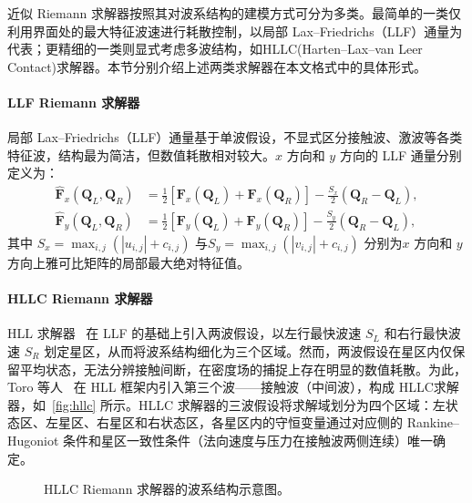\documentclass[12pt,a4paper]{article}
\numberwithin{equation}{section}    %
\begin{document}
近似 Riemann 求解器按照其对波系结构的建模方式可分为多类。最简单的一类仅利用界面处的最大特征波速进行耗散控制，以局部 Lax--Friedrichs（LLF）通量为代表；更精细的一类则显式考虑多波结构，如HLLC(Harten–Lax–van Leer Contact)求解器。本节分别介绍上述两类求解器在本文格式中的具体形式。

\paragraph{LLF Riemann 求解器}

局部 Lax--Friedrichs（LLF）通量基于单波假设，不显式区分接触波、激波等各类特征波，结构最为简洁，但数值耗散相对较大。$x$ 方向和 $y$ 方向的 LLF 通量分别定义为：
\begin{equation}
    \label{eq:llf}
    \begin{aligned}
        \hat{\bm{F}}_x(\bm{Q}_L, \bm{Q}_R)
         & = \frac{1}{2}\left[\bm{F}_x(\bm{Q}_L) + \bm{F}_x(\bm{Q}_R)\right]
        - \frac{S_x}{2}\left(\bm{Q}_R - \bm{Q}_L\right), \\
        \hat{\bm{F}}_y(\bm{Q}_L, \bm{Q}_R)
         & = \frac{1}{2}\left[\bm{F}_y(\bm{Q}_L) + \bm{F}_y(\bm{Q}_R)\right]
        - \frac{S_y}{2}\left(\bm{Q}_R - \bm{Q}_L\right),
    \end{aligned}
\end{equation}
其中 $S_x = \max_{i,j}(|u_{i,j}| + c_{i,j})$ 与$S_y = \max_{i,j}(|v_{i,j}| + c_{i,j})$ 分别为$x$ 方向和 $y$ 方向上雅可比矩阵的局部最大绝对特征值。

\paragraph{HLLC Riemann 求解器}
HLL 求解器~\cite{harten1983upstream} 在 LLF 的基础上引入两波假设，以左行最快波速 $S_L$ 和右行最快波速 $S_R$ 划定星区，从而将波系结构细化为三个区域。然而，两波假设在星区内仅保留平均状态，无法分辨接触间断，在密度场的捕捉上存在明显的数值耗散。为此，Toro 等人~\cite{toro1994restoration} 在 HLL 框架内引入第三个波——接触波（中间波），构成 HLLC求解器，如~\autoref{fig:hllc} 所示。HLLC 求解器的三波假设将求解域划分为四个区域：左状态区、左星区、右星区和右状态区，各星区内的守恒变量通过对应侧的 Rankine--Hugoniot 条件和星区一致性条件（法向速度与压力在接触波两侧连续）唯一确定。
\begin{figure}[htbp]
    \centering
    
    \caption{HLLC Riemann 求解器的波系结构示意图。}
    \label{fig:hllc}
\end{figure}
    
\end{document}

